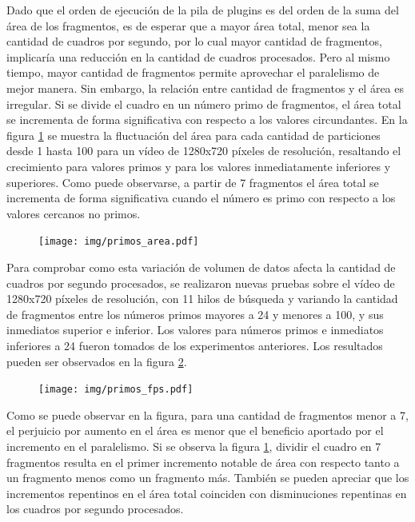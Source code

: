 Dado que el orden de ejecución de la pila de plugins es del orden de la suma del
área de los fragmentos, es de esperar que a mayor área total, menor sea la
cantidad de cuadros por segundo, por lo cual mayor cantidad de fragmentos,
implicaría una reducción en la cantidad de cuadros procesados. Pero al mismo
tiempo, mayor cantidad de fragmentos permite aprovechar el paralelismo de mejor
manera. Sin embargo, la relación entre cantidad de fragmentos y el área es
irregular. Si se divide el cuadro en un número primo de fragmentos, el área
total se incrementa de forma significativa con respecto a los valores
circundantes. En la figura \ref{primosArea} se muestra la fluctuación del área
para cada cantidad de particiones desde 1 hasta 100 para un vídeo de 1280x720
píxeles de resolución, resaltando el crecimiento para valores primos y para los
valores inmediatamente inferiores y superiores. Como puede observarse, a partir
de 7 fragmentos el área total se incrementa de forma significativa cuando el
número es primo con respecto a los valores cercanos no primos.

\begin{figure}[!h]

	\texttt{[image: img/primos\_area.pdf]}
	\caption{}
	\label{primosArea}

\end{figure}

Para comprobar como esta variación de volumen de datos afecta la cantidad de
cuadros por segundo procesados, se realizaron nuevas pruebas sobre el vídeo de
1280x720 píxeles de resolución, con 11 hilos de búsqueda y variando la cantidad
de fragmentos entre los números primos mayores a 24 y menores a 100, y sus
inmediatos superior e inferior. Los valores para números primos e inmediatos
inferiores a 24 fueron tomados de los experimentos anteriores. Los resultados
pueden ser observados en la figura \ref{primosFPS}.

\begin{figure}[!h]

	\texttt{[image: img/primos\_fps.pdf]}
	\caption{}
	\label{primosFPS}

\end{figure}

Como se puede observar en la figura, para una cantidad de fragmentos menor a 7,
el perjuicio por aumento en el área es menor que el beneficio aportado por el
incremento en el paralelismo. Si se observa la figura \ref{primosArea}, dividir
el cuadro en 7 fragmentos resulta en el primer incremento notable de área con
respecto tanto a un fragmento menos como un fragmento más. También se pueden
apreciar que los incrementos repentinos en el área total coinciden con
disminuciones repentinas en los cuadros por segundo procesados.

